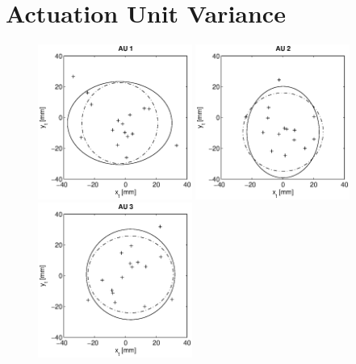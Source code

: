 

\section{Actuation Unit Variance}
\begin{figure}[hbtp]
\centering
\includegraphics[width = 0.45\textwidth]{images/results/confidence_95_interval_AU1.eps}
\includegraphics[width = 0.45\textwidth]{images/results/confidence_95_interval_AU2.eps} \\
\includegraphics[width = 0.45\textwidth]{images/results/confidence_95_interval_AU3.eps}

\end{figure}
